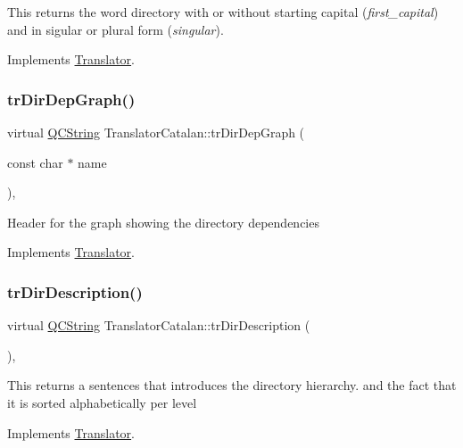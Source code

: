 This returns the word directory with or without starting capital ({\itshape first\+\_\+capital}) and in sigular or plural form ({\itshape singular}). 

Implements \mbox{\hyperlink{class_translator}{Translator}}.

\mbox{\label{class_translator_catalan_af31acbb2bd1658f9fdfe832be789c703}} 
\subsubsection{\texorpdfstring{trDirDepGraph()}{trDirDepGraph()}}
{\footnotesize\ttfamily virtual \mbox{\hyperlink{class_q_c_string}{Q\+C\+String}} Translator\+Catalan\+::tr\+Dir\+Dep\+Graph (\begin{DoxyParamCaption}\item[{const char $\ast$}]{name }\end{DoxyParamCaption})\hspace{0.3cm}{\ttfamily [inline]}, {\ttfamily [virtual]}}

Header for the graph showing the directory dependencies 

Implements \mbox{\hyperlink{class_translator}{Translator}}.

\mbox{\label{class_translator_catalan_a3d5f1a8c02b4f59ebf3a143cfdb37bbb}} 
\subsubsection{\texorpdfstring{trDirDescription()}{trDirDescription()}}
{\footnotesize\ttfamily virtual \mbox{\hyperlink{class_q_c_string}{Q\+C\+String}} Translator\+Catalan\+::tr\+Dir\+Description (\begin{DoxyParamCaption}{ }\end{DoxyParamCaption})\hspace{0.3cm}{\ttfamily [inline]}, {\ttfamily [virtual]}}

This returns a sentences that introduces the directory hierarchy. and the fact that it is sorted alphabetically per level 

Implements \mbox{\hyperlink{class_translator}{Translator}}.

